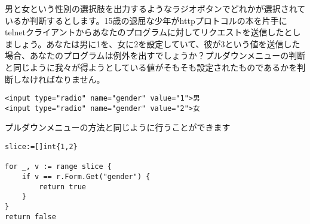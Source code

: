 男と女という性別の選択肢を出力するようなラジオボタンでどれかが選択されているか判断するとします。15歳の退屈な少年がhttpプロトコルの本を片手にtelnetクライアントからあなたのプログラムに対してリクエストを送信したとしましょう。あなたは男に1を、女に2を設定していて、彼が3という値を送信した場合、あなたのプログラムは例外を出すでしょうか？プルダウンメニューの判断と同じように我々が得ようとしている値がそもそも設定されたものであるかを判断しなければなりません。

\begin{lstlisting}[numbers=none]
<input type="radio" name="gender" value="1">男
<input type="radio" name="gender" value="2">女
\end{lstlisting}

プルダウンメニューの方法と同じように行うことができます

\begin{lstlisting}[numbers=none]
slice:=[]int{1,2}

for _, v := range slice {
    if v == r.Form.Get("gender") {
        return true
    }
}
return false
\end{lstlisting}

